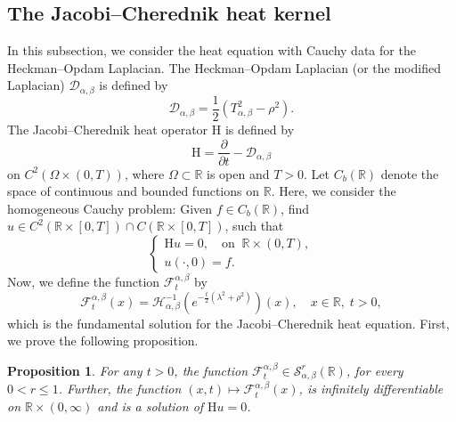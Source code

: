 \documentclass[a4paper,11pt, reqno]{amsart}
\theoremstyle{plain}
\newtheorem{proposition}[theorem]{Proposition}
\theoremstyle{definition}
\theoremstyle{remark}
\def \R{{\mathbb R}}
\def\R{\mathbb R}
\def \S{{\mathcal S}}
\def \H{{\mathcal H}}
\begin{document}
\subsection{The Jacobi--Cherednik heat kernel}

In this subsection, we consider the heat equation with Cauchy data for the Heckman--Opdam Laplacian. The Heckman--Opdam Laplacian (or the modified Laplacian) $\mathcal{D}_{\alpha, \beta}$ is defined by 
\[ \mathcal{D}_{\alpha, \beta}=\frac{1}{2} \left( T^2_{\alpha, \beta} - \rho^2\right).\]
The Jacobi--Cherednik heat operator $\mathrm{H}$ is defined by
\[ \mathrm{H}=\frac{\partial}{\partial t} -\mathcal{D}_{\alpha, \beta} \]
on $C^2(\Omega \times (0, T))$, where $\Omega \subset \mathbb{R}$ is open and $T>0$. Let $C_b(\mathbb{R})$ denote the space of continuous and bounded functions on $\mathbb{R}$. Here, we consider the homogeneous Cauchy problem: Given $f  \in C_b(\mathbb{R})$, find $u \in C^2(\mathbb{R} \times [0, T]) \cap C (\mathbb{R} \times [0, T])$, such that 
\begin{equation}\label{eq07}
\left\{\begin{array}{l}
\mathrm{H} u =0, \quad \text{on} \;\; \mathbb{R} \times (0, T), \\
u(\cdot, 0)=f.
\end{array}\right.
\end{equation}
Now, we define the function $\mathcal{F}_t^{\alpha, \beta}$ by
\begin{equation}\label{eq08}
\mathcal{F}_t^{\alpha, \beta}(x)= \H_{\alpha, \beta}^{-1}  \left(  e^{-\frac{t}{2}\left( \lambda^2 + \rho^2 \right)}  \right)(x), \quad x \in \R, \; t>0,
\end{equation}
which is the fundamental solution for the Jacobi--Cherednik heat equation. First, we prove the following proposition.
\begin{proposition}\label{pro2}
For any $t>0$, the function $\mathcal{F}_t^{\alpha, \beta} \in \S^r_{\alpha, \beta} (\mathbb{R})$, for every $0< r \leq 1$. Further, the function $(x, t) \mapsto \mathcal{F}_t^{\alpha, \beta} (x)$, is infinitely differentiable on $ \mathbb{R} \times (0, \infty)$ and is a solution of $\mathrm{H} u = 0$.
\end{proposition} 
\end{document}
